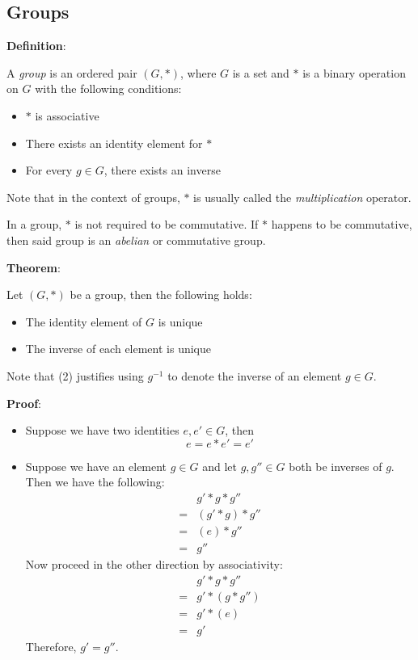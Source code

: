 \documentclass{article}
\begin{document}
\begin{multicols*}{2}
\section{Groups}

\textbf{Definition}:

A \textit{group} is an ordered pair $(G,*)$, where $G$ is a set and $*$ is a binary operation on $G$ with the following conditions:

\begin{itemize}
    \item $*$ is associative
    \item There exists an identity element for $*$
    \item For every $g \in G$, there exists an inverse
\end{itemize}

Note that in the context of groups, $*$ is usually called the \textit{multiplication} operator.

In a group, $*$ is not required to be commutative. If $*$ happens to be commutative, then said group is an \textit{abelian} or commutative group.

\textbf{Theorem}:

Let $(G, *)$ be a group, then the following holds:

\begin{itemize}
    \item[(1)] The identity element of $G$ is unique
    \item[(2)] The inverse of each element is unique
\end{itemize}

Note that (2) justifies using $g^{-1}$ to denote the inverse of an element $g \in G$.

\textbf{Proof}:

\begin{itemize}
    \item[(1)] Suppose we have two identities $e, e' \in G$, then \[e = e * e' = e'\]
    \item[(2)] Suppose we have an element $g \in G$ and let $g
    , g'' \in G$ both be inverses of $g$. Then we have the following:\[\begin{aligned}
        &g'*g*g''\\
        = &(g'*g)*g''\\
        = &(e)*g''\\
        = &g''
    \end{aligned}\] Now proceed in the other direction by associativity:\[\begin{aligned}
        &g'*g*g''\\
        = &g'*(g*g'')\\
        = &g'*(e)\\
        = &g'
    \end{aligned}\] Therefore, $g' = g''$.
\end{itemize}


\end{multicols*}
\end{document}
